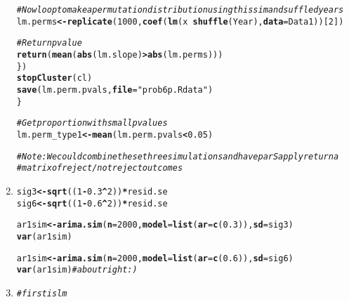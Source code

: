 \documentclass[11pt]{article}\usepackage[]{graphicx}\usepackage[]{color}
\makeatletter
\newcommand{\hlnum}[1]{\textcolor[rgb]{0,0,0}{#1}}%
\newcommand{\hlstr}[1]{\textcolor[rgb]{0,0,0}{#1}}%
\newcommand{\hlcom}[1]{\textcolor[rgb]{0.4,0.4,0.4}{\textit{#1}}}%
\newcommand{\hlopt}[1]{\textcolor[rgb]{0,0,0}{\textbf{#1}}}%
\newcommand{\hlstd}[1]{\textcolor[rgb]{0,0,0}{#1}}%
\newcommand{\hlkwb}[1]{\textcolor[rgb]{0,0,0}{\textbf{#1}}}%
\newcommand{\hlkwc}[1]{\textcolor[rgb]{0,0,0}{\textbf{#1}}}%
\newcommand{\hlkwd}[1]{\textcolor[rgb]{0,0,0}{\textbf{#1}}}%
\newenvironment{kframe}{%
 \def\at@end@of@kframe{}%
 \ifinner\ifhmode%
  \def\at@end@of@kframe{\end{minipage}}%
  \begin{minipage}{\columnwidth}%
 \fi\fi%
 \def\FrameCommand##1{\hskip\@totalleftmargin \hskip-\fboxsep
 \colorbox{shadecolor}{##1}\hskip-\fboxsep
     \hskip-\linewidth \hskip-\@totalleftmargin \hskip\columnwidth}%
 \MakeFramed {\advance\hsize-\width
   \@totalleftmargin\z@ \linewidth\hsize
   \@setminipage}}%
 {\par\unskip\endMakeFramed%
 \at@end@of@kframe}
\newenvironment{knitrout}{}{} %
\makeatother
\begin{document}
\begin{enumerate}
\begin{knitrout}
\begin{kframe}
\begin{alltt}
    \hlcom{# Now loop to make a permutation distribution using this sim and suffled years}
    \hlstd{lm.perms} \hlkwb{<-} \hlkwd{replicate}\hlstd{(}\hlnum{1000}\hlstd{,} \hlkwd{coef}\hlstd{(}\hlkwd{lm}\hlstd{(x} \hlopt{~} \hlkwd{shuffle}\hlstd{(Year),} \hlkwc{data} \hlstd{= Data1))[}\hlnum{2}\hlstd{])}

    \hlcom{# Return pvalue}
    \hlkwd{return}\hlstd{(}\hlkwd{mean}\hlstd{(}\hlkwd{abs}\hlstd{(lm.slope)} \hlopt{>} \hlkwd{abs}\hlstd{(lm.perms)))}
  \hlstd{\})}
  \hlkwd{stopCluster}\hlstd{(cl)}
  \hlkwd{save}\hlstd{(lm.perm.pvals,} \hlkwc{file} \hlstd{=} \hlstr{"prob6p.Rdata"}\hlstd{)}
\hlstd{\}}

\hlcom{# Get proportion with small pvalues}
\hlstd{lm.perm_type1} \hlkwb{<-} \hlkwd{mean}\hlstd{(lm.perm.pvals} \hlopt{<} \hlnum{0.05}\hlstd{)}


\hlcom{# Note: We could combine these three simulations and have parSapply return a}
\hlcom{# matrix of reject/not reject outcomes}
\end{alltt}
\end{kframe}
\end{knitrout}
\item%
\begin{knitrout}\footnotesize
{}\color{fgcolor}\begin{kframe}
\begin{alltt}
\hlstd{sig3} \hlkwb{<-} \hlkwd{sqrt}\hlstd{((}\hlnum{1}\hlopt{-}\hlnum{0.3}\hlopt{^}\hlnum{2}\hlstd{))} \hlopt{*} \hlstd{resid.se}
\hlstd{sig6} \hlkwb{<-} \hlkwd{sqrt}\hlstd{((}\hlnum{1}\hlopt{-}\hlnum{0.6}\hlopt{^}\hlnum{2}\hlstd{))} \hlopt{*} \hlstd{resid.se}

\hlstd{ar1sim}\hlkwb{<-}\hlkwd{arima.sim}\hlstd{(}\hlkwc{n}\hlstd{=}\hlnum{2000}\hlstd{,}\hlkwc{model}\hlstd{=}\hlkwd{list}\hlstd{(}\hlkwc{ar}\hlstd{=}\hlkwd{c}\hlstd{(}\hlnum{0.3}\hlstd{)),}\hlkwc{sd}\hlstd{=sig3)}
\hlkwd{var}\hlstd{(ar1sim)}

\hlstd{ar1sim}\hlkwb{<-}\hlkwd{arima.sim}\hlstd{(}\hlkwc{n}\hlstd{=}\hlnum{2000}\hlstd{,}\hlkwc{model}\hlstd{=}\hlkwd{list}\hlstd{(}\hlkwc{ar}\hlstd{=}\hlkwd{c}\hlstd{(}\hlnum{0.6}\hlstd{)),}\hlkwc{sd}\hlstd{=sig6)}
\hlkwd{var}\hlstd{(ar1sim)} \hlcom{# about right :)}
\end{alltt}
\end{kframe}
\end{knitrout}
\item%
\begin{knitrout}\footnotesize
{}\color{fgcolor}\begin{kframe}
\begin{alltt}
\hlcom{# first is lm}


\end{alltt}
\end{kframe}
\end{knitrout}
\end{enumerate}
\end{document}
